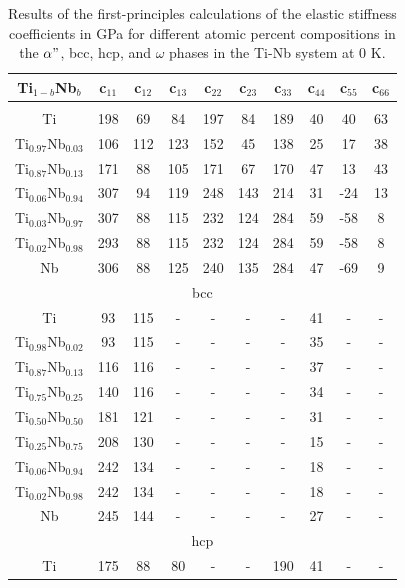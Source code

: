\newpage
\begin{longtable}[H]{ c c c c c c c c c c }
	\caption{Results of the first-principles calculations of the elastic stiffness coefficients in GPa for different atomic percent compositions in the $\alpha"$, bcc, hcp, and $\omega$  phases in the Ti-Nb system at 0 K.} 	\label{Ch7-table:tinbdata} \\
	\hline
	Ti$_{1-b}$Nb$_b$ & c$_{11}$ & c$_{12}$ & c$_{13}$ & c$_{22}$ & c$_{23}$ & c$_{33}$ & c$_{44}$ & c$_{55}$ & c$_{66}$\\
	\hline
	\endhead
	\hline
	\endfoot
	\multicolumn{10}{c}{$\alpha"$}\\
	\hline
	Ti & 198 & 69 & 84 & 197 & 84 & 189 & 40 & 40 & 63 \\		
	Ti$_{0.97}$Nb$_{0.03}$ & 106 & 112 & 123 & 152 & 45 & 138 & 25 & 17 & 38 \\
	Ti$_{0.87}$Nb$_{0.13}$ & 171 & 88 & 105 & 171 & 67 & 170 & 47 & 13 & 43 \\
	Ti$_{0.06}$Nb$_{0.94}$ & 307 & 94 & 119 & 248 & 143 & 214 & 31 & -24 & 13 \\
	Ti$_{0.03}$Nb$_{0.97}$ & 307 & 88 & 115 & 232 & 124 & 284 & 59 & -58 & 8 \\
	Ti$_{0.02}$Nb$_{0.98}$ & 293 & 88 & 115 & 232 & 124 & 284 & 59 & -58 & 8 \\
	Nb & 306 & 88 & 125 & 240 & 135 & 284 & 47 & -69 & 9 \\
	\hline
	\multicolumn{10}{c}{bcc}\\
	\hline
	Ti & 93 & 115 & - & - & - & - & 41 & - & - \\		
	Ti$_{0.98}$Nb$_{0.02}$ & 93 & 115 & - & - & - & - & 35 & - & - \\
	Ti$_{0.87}$Nb$_{0.13}$ & 116 & 116 & - & - & - & - & 37 & - & - \\
	Ti$_{0.75}$Nb$_{0.25}$ & 140 & 116 & - & - & - & - & 34 & - & - \\
	Ti$_{0.50}$Nb$_{0.50}$ & 181 & 121 & - & - & - & - & 31 & - & - \\
	Ti$_{0.25}$Nb$_{0.75}$ & 208 & 130 & - & - & - & - & 15 & - & - \\
	Ti$_{0.06}$Nb$_{0.94}$ & 242 & 134 & - & - & - & - & 18 & - & - \\
	Ti$_{0.02}$Nb$_{0.98}$ & 242 & 134 & - & - & - & - & 18 & - & - \\
	Nb & 245 & 144 & - & - & - & - & 27 & - & - \\
	\hline
	\multicolumn{10}{c}{hcp}\\
	\hline
	Ti & 175 & 88 & 80 & - & - & 190 & 41 & - & - \\		

\end{longtable}
